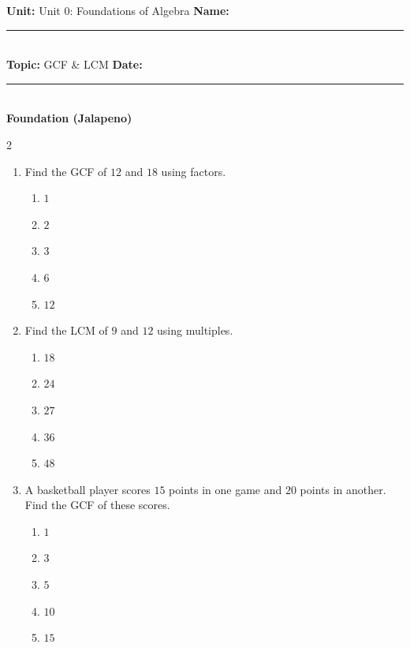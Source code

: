 \documentclass[10pt]{article}
\begin{document}
\enlargethispage{2.5cm}

\begin{tcolorbox}[colback=mainblue!5, colframe=mainblue, sharp corners, boxrule=0.5pt]
    \small \textbf{Unit:} Unit 0: Foundations of Algebra \hfill \textbf{Name:} \rule{3cm}{0.4pt} \\
    \small \textbf{Topic:} GCF & LCM \hfill \textbf{Date:} \rule{2cm}{0.4pt} \\
    \centering \textbf{\large Foundation (Jalapeno)}
\end{tcolorbox}

\vspace{0.2cm}

\begin{multicols}{2}
\begin{enumerate}[label=\textbf{Q\arabic*.}, leftmargin=*, itemsep=6pt, parsep=0pt]

  \item \small Find the GCF of $12$ and $18$ using factors.
  \begin{enumerate}[label=(\Alph*), leftmargin=0.6cm, nosep, itemsep=2pt]
    \item $1$
    \item $2$
    \item $3$
    \item $6$
    \item $12$
  \end{enumerate}

  \item \small Find the LCM of $9$ and $12$ using multiples.
  \begin{enumerate}[label=(\Alph*), leftmargin=0.6cm, nosep, itemsep=2pt]
    \item $18$
    \item $24$
    \item $27$
    \item $36$
    \item $48$
  \end{enumerate}

  \item \small A basketball player scores $15$ points in one game and $20$ points in another. Find the GCF of these scores.
  \begin{enumerate}[label=(\Alph*), leftmargin=0.6cm, nosep, itemsep=2pt]
    \item $1$
    \item $3$
    \item $5$
    \item $10$
    \item $15$
  \end{enumerate}


\end{enumerate}
\end{multicols}
\end{document}
